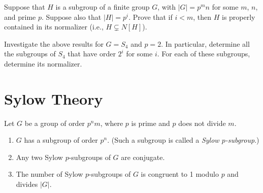 \begin{problem}\label{prob:hpropinnorm}
Suppose that $H$ is a subgroup of a finite group $G$, with $|G| = p^m n$ for some $m$, $n$, and prime $p$. Suppose also that $\lvert H \rvert = p^i$. Prove that if $i<m$, then $H$ is properly contained in its normalizer (i.e., $H \subsetneq N[H]$).
\end{problem}

\begin{problem}\label{prob:s4subgroups2}
Investigate the above results for $G = S_4$ and $p = 2$.  In particular, determine all the subgroups of $S_4$ that have order $2^i$ for some $i$.  For each of these subgroups, determine its normalizer.
\begin{annotation}
\end{annotation}
\end{problem}


\section{Sylow Theory}

\begin{theorem}\label{thm:sylow}
 Let $G$ be a group of order $p^nm$, where $p$ is prime and $p$ does not divide $m$.
\begin{annotation}
\end{annotation}
 \begin{enumerate}
  \item $G$ has a subgroup of order $p^n$. (Such a subgroup is called a \emph{Sylow $p$-subgroup}.)
  \item Any two Sylow $p$-subgroups of $G$ are conjugate.
\begin{annotation}
\end{annotation}
  \item The number of Sylow $p$-subgroups of $G$ is congruent to 1 modulo $p$ and divides $\lvert G \rvert$.
 \end{enumerate}
\end{theorem}

